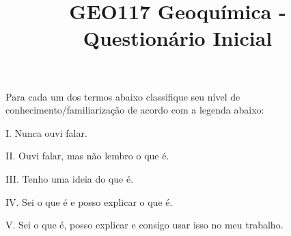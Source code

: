 \documentclass[a4paper,10pt]{article}
\title{GEO117 Geoquímica - Questionário Inicial}
\author{\vspace{-10ex}}
\date{\vspace{-10ex}}
\begin{document}
  \maketitle
  \onehalfspace


Para cada um dos termos abaixo classifique seu nível de conhecimento/familiarização de acordo com a legenda abaixo:

\begin{multicols}{2}

I. Nunca ouvi falar.

II. Ouvi falar, mas não lembro o que é.

III. Tenho uma ideia do que é.

IV. Sei o que é e posso explicar o que é.

V. Sei o que é, posso explicar e consigo usar isso no meu trabalho.

\end{multicols}
\end{document}
